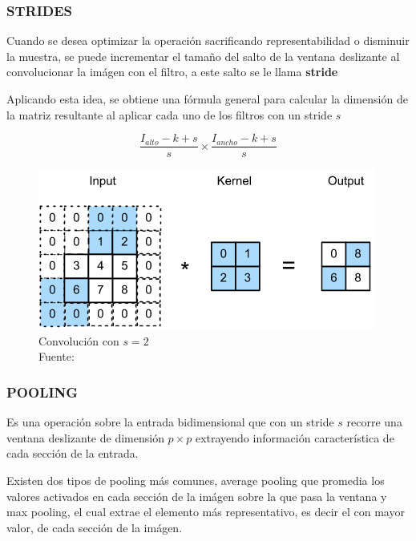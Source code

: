         \subsubsection{STRIDES}
        Cuando se desea optimizar la operación sacrificando representabilidad o disminuir la muestra, se puede incrementar el tamaño del salto de la ventana deslizante al convolucionar la imágen con el filtro, a este salto se le llama \textbf{stride}
        
        
        Aplicando esta idea, se obtiene una fórmula general para calcular la dimensión de la matriz resultante al aplicar cada uno de los filtros con un stride $s$
        
        $$\frac{I_{alto} - k + s}{s} \times \frac{I_{ancho} - k + s}{s}$$ 
        
        \begin{figure}[H]
            \centering
            \includegraphics[scale=0.55]{imagenes/stride}
            \caption[Convolución con $s=2$]{Convolución con $s=2$\\ Fuente: \citep{zhang2020dive}}
        \end{figure}
        \subsubsection{POOLING}
        Es una operación sobre la entrada bidimensional que con un stride $s$ recorre una ventana deslizante de dimensión $p \times p$ extrayendo información característica de cada sección de la entrada.
        
        Existen dos tipos de pooling más comunes, average pooling que promedia los valores activados en cada sección de la imágen sobre la que pasa la ventana y max pooling, el cual extrae el elemento más representativo, es decir el con mayor valor, de cada sección de la imágen.
        

